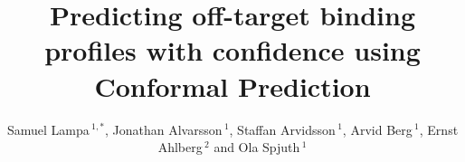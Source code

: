 \documentclass[utf8]{frontiersSCNS} %
\def\firstAuthorLast{Lampa {et~al.}} %
\def\Authors{Samuel Lampa\,$^{1,*}$, Jonathan Alvarsson\,$^{1}$, Staffan Arvidsson\,$^{1}$, Arvid Berg\,$^{1}$, Ernst Ahlberg\,$^{2}$  and Ola Spjuth\,$^{1}$}
\begin{document}
\onecolumn
{}

\title[Predicting off-target binding profiles with confidence using Conformal
Prediction]{Predicting off-target binding profiles with confidence using Conformal
Prediction}

\author[\firstAuthorLast ]{\Authors} %
\address{} %
\correspondance{} %

\extraAuth{}%


\maketitle
\end{document}
